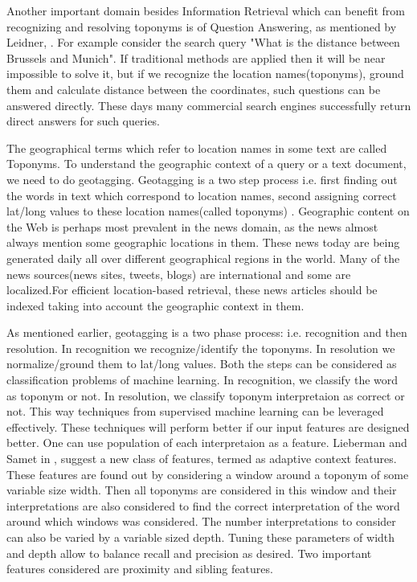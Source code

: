 \documentclass[
     11pt,         %
     a4paper,      %
     oneside,
     ]{article}
\begin{document}
Another important domain besides Information Retrieval which can benefit from recognizing and resolving toponyms is of Question Answering, as mentioned by Leidner\cite{Leidner:2008:PhD}, . For example consider the search query "What is the distance between Brussels and Munich". If traditional methods are applied then it will be near impossible to solve it, but if we recognize the location names(toponyms), ground them and calculate distance between the coordinates, such questions can be answered directly. These days many commercial search engines successfully return direct answers for such queries. 

The geographical terms which refer to location names in some text are called Toponyms. To understand the geographic context of a query or a text document, we need to do geotagging. Geotagging is a two step process i.e. first finding out the words in text which correspond to location names, second assigning correct lat/long values to these location names(called toponyms) \cite{Lieberman12adaptivecontext}. Geographic content on the Web is perhaps most prevalent in the news domain, as the news almost always mention some geographic locations in them. These news today are being generated daily all over different geographical regions in the world. Many of the news sources(news sites, tweets, blogs) are international and some are localized.For efficient location-based retrieval, these news articles should be indexed taking into account the geographic context in them.

As mentioned earlier, geotagging is a two phase process: i.e. recognition and then resolution. In recognition we recognize/identify the toponyms. In resolution we normalize/ground them to lat/long values. Both the steps can be considered as classification problems of machine learning. In recognition, we classify the word as toponym or not. In resolution, we classify toponym interpretaion as correct or not. This way techniques from supervised machine learning can be leveraged effectively. These techniques will perform better if our input features are designed better. One can use population of each interpretaion as a feature. Lieberman and Samet in \cite{Lieberman12adaptivecontext}, suggest a new class of features, termed as adaptive context features. These features are found out by considering a window around a toponym of some variable size width. Then all toponyms are considered in this window and their interpretations are also considered to find the correct interpretation of the word around which windows was considered. The number interpretations to consider can also be varied by a variable sized depth. Tuning these parameters of width and depth allow to balance recall and precision as desired. Two important features considered are proximity and sibling features. 
\end{document}
